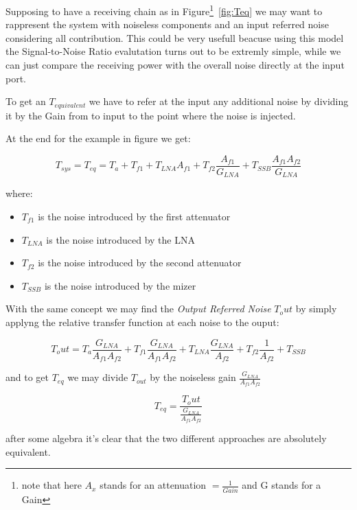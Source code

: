 Supposing to have a receiving chain as in Figure\footnote{note that here $A_x$ stands for an attenuation $= \frac{1}{Gain}$ and G stands for a Gain}~\ref{fig:Teq} we may want to rappresent the system with noiseless components and an input referred noise considering all contribution.
This could be very usefull beacuse using this model the Signal-to-Noise Ratio evalutation turns out to be extremly simple, while we can just compare the receiving power with the overall noise directly at the input port.

To get an $T_{equivalent}$ we have to refer at the input any additional noise by dividing it by the Gain from to input to the point where the noise is injected.

At the end for the example in figure we get:

\begin{equation}
	T_{sys}=T_{eq}= T_a + T_{f1} + T_{LNA} A_{f1}+ T_{f2} \frac { A_{f1} } {G_{LNA}} + T_{SSB} \frac { A_{f1} A_{f2} } {G_{LNA}}
\end{equation}

where:
\begin{itemize}
	\item $T_{f1}$ is the noise introduced by the first attenuator
	\item $T_{LNA}$ is the noise introduced by the LNA
	\item $T_{f2}$ is the noise introduced by the second attenuator
	\item $T_{SSB}$ is the noise introduced by the mizer
\end{itemize}
With the same concept we may find the \textit{Output Referred Noise} $T_out$ by simply applyng the relative transfer function at each noise to the ouput:

\begin{equation}
	T_out = T_a\frac {G_{LNA}} {A_{f1} A_{f2} } + T_{f1}\frac { G_{LNA}} {A_{f1}A_{f2}} + T_{LNA}\frac{G_{LNA}}{A_{f2}}+ T_{f2}\frac{1}{A_{f2}} + T_{SSB} 
\end{equation}

and to get $T_{eq}$ we may divide $T_{out}$ by the noiseless gain $\frac{G_{LNA}}{A_{f1}A_{f2}}$

\begin{equation}
	T_{eq}=\frac{T_out}{\frac{G_{LNA}}{A_{f1}A_{f2}}}
\end{equation}

after some algebra it's clear that the two different approaches are absolutely equivalent.



